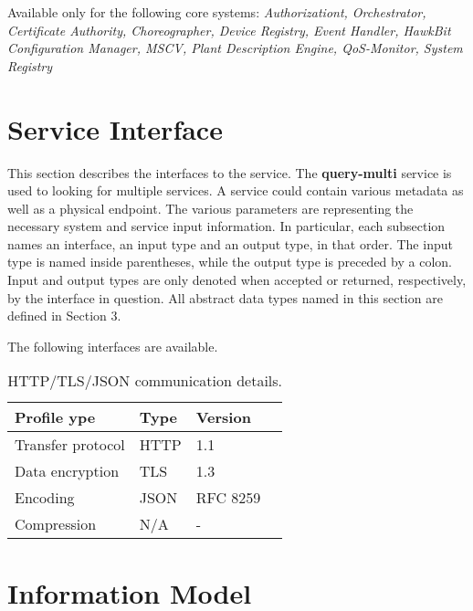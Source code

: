 \documentclass[a4paper]{arrowhead}
\begin{document}
Available only for the following core systems: \textit{Authorizationt, Orchestrator, Certificate Authority, Choreographer, Device Registry, Event Handler, HawkBit Configuration Manager, MSCV, Plant Description Engine, QoS-Monitor, System Registry}

\newpage

\section{Service Interface}
\label{sec:functions}

This section describes the interfaces to the service. The \textbf{query-multi} service is used to looking for multiple services. A service could contain various metadata as well as a physical endpoint. The various parameters are representing the necessary system and service input information.
In particular, each subsection names an interface, an input type and an output type, in that order.
The input type is named inside parentheses, while the output type is preceded by a colon.
Input and output types are only denoted when accepted or returned, respectively, by the interface in question. All abstract data types named in this section are defined in Section 3.

The following interfaces are available.


\begin{table}[ht!]
  \centering
  \begin{tabular}{|l|l|l|l|}
    \rowcolor{gray!33} Profile ype & Type & Version \\ \hline
    Transfer protocol & HTTP & 1.1 \\ \hline
    Data encryption & TLS & 1.3 \\ \hline
    Encoding & JSON & RFC 8259 \cite{rfc8259} \\ \hline
    Compression & N/A & - \\ \hline
  \end{tabular}
  \caption{HTTP/TLS/JSON communication details.}
  \label{tab:comunication_semantics_profile}
\end{table}

\clearpage

\section{Information Model}
\label{sec:model}
\end{document}
